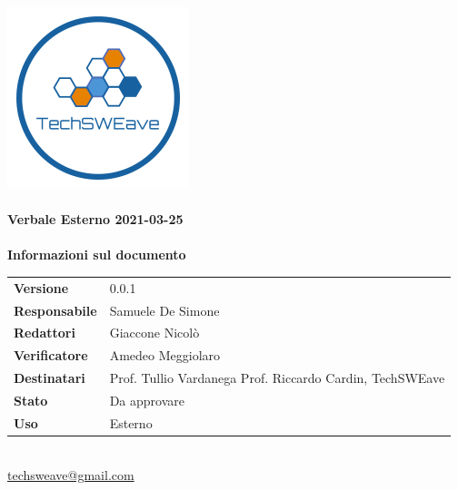 \documentclass[a4paper]{article}
\begin{document}
\begin{titlepage}
    \begin{center}
        \includegraphics{../../../../Images/logo.png}\\
        \vspace{20px}
        \textcolor{logo}{\hrulefill}\\
        \vspace{20px}
        \textbf{\huge\textcolor{logo}{Verbale Esterno 2021-03-25}}\\
        \vspace{10px}
        \textcolor{logo}{\hrulefill}\\
        \vspace{40px}
        \textbf{\Large Informazioni sul documento}\\
        \vspace{20px}
        \begin{tabular}{p{100px} | p{100px}}
            \textbf{Versione} & 0.0.1\\
            \textbf{Responsabile} & Samuele De Simone\\
            \textbf{Redattori} & Giaccone Nicolò\\
            \textbf{Verificatore} & Amedeo Meggiolaro\\
            \textbf{Destinatari} & Prof. Tullio Vardanega \newline Prof. Riccardo Cardin, \newline TechSWEave\\
            \textbf{Stato} & Da approvare\\
            \textbf{Uso} & Esterno\\
        \end{tabular}\\
        \vspace{60px}
        \href{mailto:techsweave@gmail.com}{techsweave@gmail.com}\\

    \end{center}
    \end{titlepage}
\end{document}
